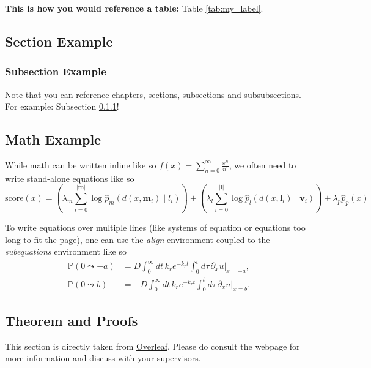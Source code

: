 \documentclass[a4paper,11pt, titlepage]{article}
\theoremstyle{definition}
\theoremstyle{plain}
\theoremstyle{remark}
\begin{document}
\lipsum[1-4] \textbf{This is how you would reference a table:} Table \ref{tab:my_label}. 

\subsection{Section Example}
\label{sec:sec_example}
\lipsum[1]
\subsubsection{Subsection Example}
\label{sec:subsec_example}
\lipsum[1]

Note that you can reference chapters, sections, subsections and subsubsections. For example: Subsection \ref{sec:subsec_example}!

\subsection{Math Example}

While math can be written inline like so $f(x) = \sum_{n=0}^{\infty} \frac{x^n}{n!}$, we often need to write stand-alone equations like so
\begin{equation}
\textrm{score}(x) = \left(\lambda_m\sum_{i=0}^{|\mathbf{m}|} \log \hat{p}_m(d(x, \mathbf{m}_i) \mid l_i)\right) + \left(\lambda_l\sum_{i=0}^{|\mathbf{l}|} \log\hat{p}_l(d(x, \mathbf{l}_i) \mid \mathbf{v}_i)\right) + \lambda_p \hat{p}_p(x)
\end{equation}

To write equations over multiple lines (like systems of equation or equations too long to fit the page), one can use the \textit{align} environment coupled to the \textit{subequations} environment like so
\begin{subequations}
\begin{align}
    \mathbb{P}(0 \leadsto -a) &= D\int_0^\infty dt\, k_r e^{-k_r t}\int_0^t d\tau\,\partial_x u \big|_{x=-a}, \\
    \mathbb{P}(0 \leadsto b) &= -D\int_0^\infty dt\, k_r e^{-k_r t}\int_0^t d\tau\,\partial_x u \big|_{x=b}.
\end{align}
\end{subequations}

\subsection{Theorem and Proofs}

This section is directly taken from \href{https://www.overleaf.com/learn/latex/Theorems_and_proofs}{Overleaf}. Please do consult the webpage for more information and discuss with your supervisors. 
\end{document}
